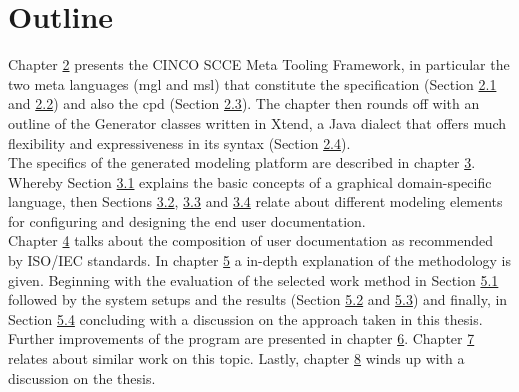 \section{Outline}
Chapter \hyperref[ch:DSL]{2} presents the CINCO SCCE Meta Tooling Framework, in particular the two meta languages (\acrfull{mgl} and \acrfull{msl}) that constitute the specification (Section \hyperref[sec:MGL]{2.1} and \hyperref[sec:MSL]{2.2}) and also the \acrfull{cpd} (Section \hyperref[sec:CPD]{2.3}). The chapter then rounds off with an outline of the Generator classes written in Xtend, a Java dialect that offers much flexibility and expressiveness in its syntax (Section \hyperref[sec:GEN]{2.4}).\\The specifics of the generated modeling platform are described in chapter \hyperref[ch:CP]{3}. Whereby Section \hyperref[sec:gDSL]{3.1} explains the basic concepts of a graphical domain-specific language, then Sections \hyperref[sec:ModElem]{3.2}, \hyperref[sec:FuncElem]{3.3} and \hyperref[sec:ConfElem]{3.4} relate about different modeling elements for configuring and designing the end user documentation.\\Chapter \hyperref[ch:userDoc]{4} talks about the composition of user documentation as recommended by ISO/IEC standards. In chapter \hyperref[ch:eval]{5} a in-depth explanation of the methodology is given. Beginning with the evaluation of the selected work method in Section \hyperref[sec:meth]{5.1} followed by the system setups and the results (Section \hyperref[sec:setup]{5.2} and \hyperref[sec:res]{5.3}) and finally, in Section \hyperref[sec:disc]{5.4} concluding with a discussion on the approach taken in this thesis.\\
Further improvements of the program are presented in chapter \hyperref[ch:futwork]{6}. Chapter \hyperref[ch:relwork]{7} relates about similar work on this topic. Lastly, chapter \hyperref[ch:concl]{8} winds up with a discussion on the thesis.